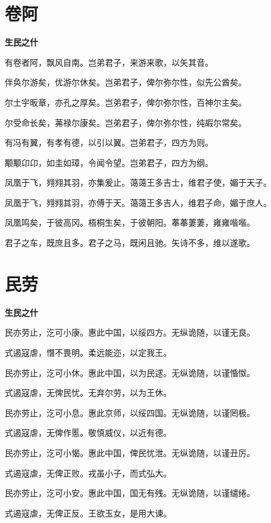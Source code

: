 \documentclass[12pt,a4paper]{ctexbook}
\begin{document}
\section{卷阿}
\textbf{生民之什}\par\vspace{0.5em}
有卷者阿，飘风自南。岂弟君子，来游来歌，以矢其音。\par
伴奂尔游矣，优游尔休矣。岂弟君子，俾尔弥尔性，似先公酋矣。\par
尔土宇昄章，亦孔之厚矣。岂弟君子，俾尔弥尔性，百神尔主矣。\par
尔受命长矣，茀禄尔康矣。岂弟君子，俾尔弥尔性，纯嘏尔常矣。\par
有冯有翼，有孝有德，以引以翼。岂弟君子，四方为则。\par
颙颙卬卬，如圭如璋，令闻令望。岂弟君子，四方为纲。\par
凤凰于飞，翙翙其羽，亦集爰止。蔼蔼王多吉士，维君子使，媚于天子。\par
凤凰于飞，翙翙其羽，亦傅于天。蔼蔼王多吉人，维君子命，媚于庶人。\par
凤凰鸣矣，于彼高冈。梧桐生矣，于彼朝阳。菶菶萋萋，雍雍喈喈。\par
君子之车，既庶且多。君子之马，既闲且驰。矢诗不多，维以遂歌。\par

\section{民劳}
\textbf{生民之什}\par\vspace{0.5em}
民亦劳止，汔可小康。惠此中国，以绥四方。无纵诡随，以谨无良。\par
式遏寇虐，憯不畏明。柔远能迩，以定我王。\par
民亦劳止，汔可小休。惠此中国，以为民逑。无纵诡随，以谨惛怓。\par
式遏寇虐，无俾民忧。无弃尔劳，以为王休。\par
民亦劳止，汔可小息。惠此京师，以绥四国。无纵诡随，以谨罔极。\par
式遏寇虐，无俾作慝。敬慎威仪，以近有德。\par
民亦劳止，汔可小愒。惠此中国，俾民忧泄。无纵诡随，以谨丑厉。\par
式遏寇虐，无俾正败。戎虽小子，而式弘大。\par
民亦劳止，汔可小安。惠此中国，国无有残。无纵诡随，以谨缱绻。\par
式遏寇虐，无俾正反。王欲玉女，是用大谏。\par
\end{document}
